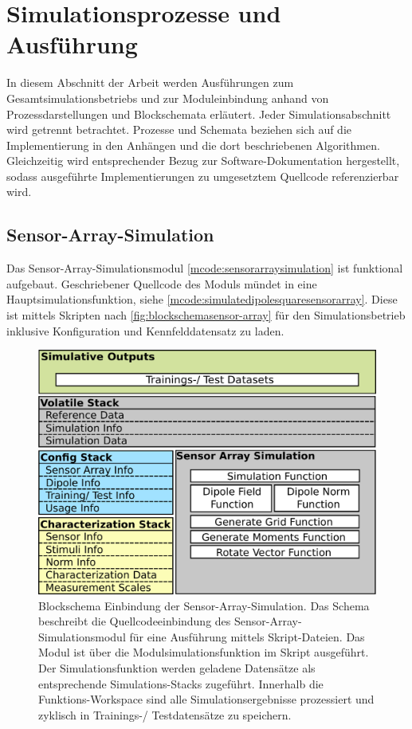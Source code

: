%

\section{Simulationsprozesse und Ausführung}\label{sec:sim-pro}


In diesem Abschnitt der Arbeit werden Ausführungen zum Gesamtsimulationsbetriebs und zur Moduleinbindung anhand von Prozessdarstellungen und Blockschemata erläutert. Jeder Simulationsabschnitt wird getrennt betrachtet. Prozesse und Schemata beziehen sich auf die Implementierung in den Anhängen und die dort beschriebenen Algorithmen. Gleichzeitig wird entsprechender Bezug zur Software-Dokumentation hergestellt, sodass ausgeführte Implementierungen zu umgesetztem Quellcode referenzierbar wird.


\subsection{Sensor-Array-Simulation}\label{sub:sensor-array-pro}


Das Sensor-Array-Simulationsmodul \autoref{mcode:sensorarraysimulation} ist funktional aufgebaut. Geschriebener Quellcode des Moduls mündet in eine Hauptsimulationsfunktion, siehe \autoref{mcode:simulatedipolesquaresensorarray}. Diese ist mittels Skripten nach \autoref{fig:blockschemasensor-array} für den Simulationsbetrieb inklusive Konfiguration und Kennfelddatensatz zu laden.

\vspace{2mm}
\begin{figure}[bph]
	\centering
	\includegraphics[width=0.7\linewidth]{chapters/images/3-SW-E-OExp/Blockschema_Sensor-Array}
	\caption[Blockschema Einbindung der Sensor-Array-Simulation]{Blockschema Einbindung der Sensor-Array-Simulation. Das Schema beschreibt die Quellcodeeinbindung des Sensor-Array-Simulationsmodul für eine Ausführung mittels Skript-Dateien. Das Modul ist über die Modulsimulationsfunktion im Skript ausgeführt. Der Simulationsfunktion werden geladene Datensätze als entsprechende Simulations-Stacks zugeführt. Innerhalb die Funktions-Workspace sind alle Simulationsergebnisse prozessiert und zyklisch in Trainings-/ Testdatensätze zu speichern.}
	\label{fig:blockschemasensor-array}
\end{figure}


